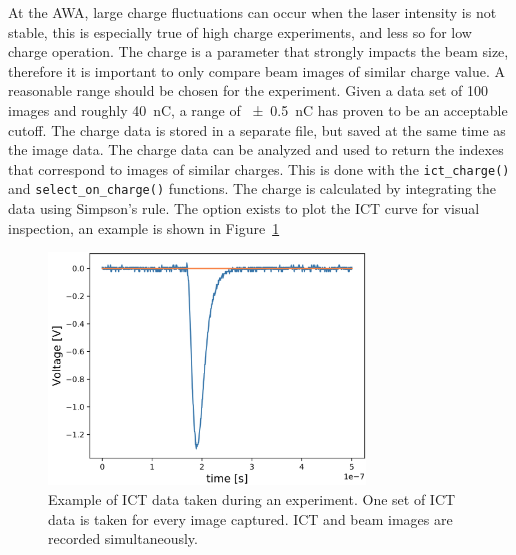 At the AWA, large charge fluctuations can occur when the laser intensity is not stable, 
this is especially true of high charge experiments, and less so for low charge operation.
The charge is a parameter that strongly impacts the beam size, 
therefore it is important to only compare beam images of similar charge value.
A reasonable range should be chosen for the experiment. 
Given a data set of 100 images and roughly \SI{40}{nC}, 
a range of \SI{\pm0.5}{nC} has proven to be an acceptable cutoff.
The charge data is stored in a separate file, 
but saved at the same time as the image data. 
The charge data can be analyzed and used to return the indexes
that correspond to images of similar charges. 
This is done with the \verb|ict_charge()| and \verb|select_on_charge()| functions.
The charge is calculated by integrating the data using Simpson's rule.
The option exists to plot the ICT curve for visual inspection, an 
example is shown in Figure~\ref{fig:ict}
\begin{figure}
	\centering
	\includegraphics[width=0.75\textwidth]{images/ictcurve}
	\caption{Example of ICT data taken during an experiment. 
	One set of ICT data is taken for every image captured. 
	ICT and beam images are recorded simultaneously.}
	\label{fig:ict}
\end{figure}

